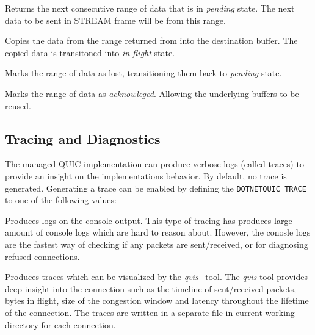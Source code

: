 \begin{description}

        Returns the next consecutive range of data that is in \textit{pending} state. The next data
to be sent in STREAM{} frame will be from this range.

        Copies the data from the range returned from  into the
destination buffer. The copied data is transitoned into \textit{in-flight} state.

        Marks the range of data as lost, transitioning them back to \textit{pending} state.

        Marks the range of data as \textit{acknowleged}. Allowing the underlying buffers to be reused.

\end{description}

\subsection{Tracing and Diagnostics}

The managed QUIC implementation can produce verbose logs (called traces) to provide an insight on
the implementations behavior. By default, no trace is generated. Generating a trace can be enabled
by defining the \texttt{DOTNETQUIC_TRACE} to one of the following values:

\begin{description}

     Produces logs on the console output. This type of tracing has produces
large amount of console logs which are hard to reason about. However, the conosle logs are the
fastest way of checking if any packets are sent/received, or for diagnosing refused connections.

 Produces traces which can be visualized by the
\textit{qvis}~\cite{web:qvis} tool. The \textit{qvis} tool provides deep insight into the connection
such as the timeline of sent/received packets, bytes in flight, size of the congestion window and
latency throughout the lifetime of the connection. The traces are written in a separate file in current
working directory for each connection.

\end{description}


